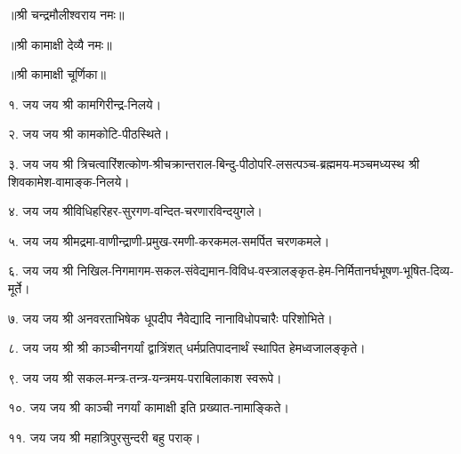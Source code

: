 ॥श्री चन्द्रमौलीश्वराय नमः॥

॥श्री कामाक्षी देव्यै नमः॥

॥श्री कामाक्षी चूर्णिका॥

१. जय जय श्री कामगिरीन्द्र-निलये। 

२. जय जय श्री कामकोटि-पीठस्थिते।

३. जय जय श्री त्रिचत्वारिंशत्कोण-श्रीचक्रान्तराल-बिन्दु-पीठोपरि-लसत्पञ्च-ब्रह्ममय-मञ्चमध्यस्थ श्री शिवकामेश-वामाङ्क-निलये।

४. जय जय श्रीविधिहरिहर-सुरगण-वन्दित-चरणारविन्दयुगले।

५. जय जय श्रीमद्रमा-वाणीन्द्राणी-प्रमुख-रमणी-करकमल-समर्पित चरणकमले।

६. जय जय श्री निखिल-निगमागम-सकल-संवेद्यमान-विविध-वस्त्रालङ्कृत-हेम-निर्मितानर्घभूषण-भूषित-दिव्य-मूर्ते।

७. जय जय श्री अनवरताभिषेक धूपदीप नैवेद्यादि नानाविधोपचारैः परिशोभिते।

८. जय जय श्री श्री काञ्चीनगर्यां द्वात्रिंशत् धर्मप्रतिपादनार्थं स्थापित हेमध्वजालङ्कृते। 

९. जय जय श्री सकल-मन्त्र-तन्त्र-यन्त्रमय-पराबिलाकाश स्वरूपे।

१०. जय जय श्री काञ्ची नगर्यां कामाक्षी इति प्रख्यात-नामाङ्किते। 

११. जय जय श्री महात्रिपुरसुन्दरी बहु पराक्। 